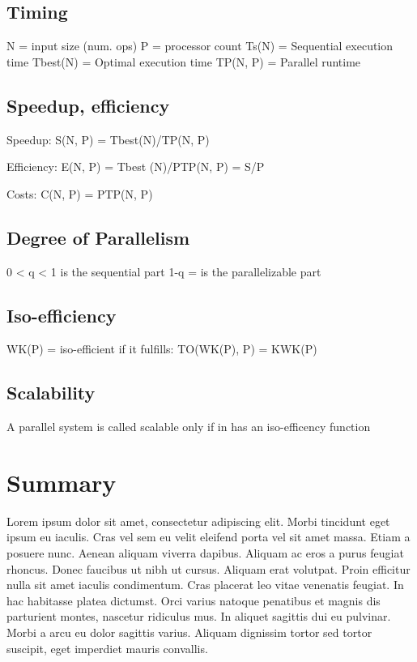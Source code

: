 \documentclass[openany]{book}
\begin{document}
\subsection{Timing}
	N = input size (num. ops)
	P = processor count
	Ts(N) = Sequential execution time
	Tbest(N) = Optimal execution time
	TP(N, P) = Parallel runtime

\subsection{Speedup, efficiency}
	Speedup: 
S(N, P) = Tbest(N)/TP(N, P)

	Efficiency: 
E(N, P) = Tbest (N)/PTP(N, P) = S/P

	Costs: 
C(N, P) = PTP(N, P)

\subsection{Degree of Parallelism}
	0 < q < 1 is the sequential part
	1-q = is the parallelizable part

\subsection{Iso-efficiency}
	WK(P) = iso-efficient if it fulfills:
	TO(WK(P), P) = KWK(P)~\cite[p.~350]{Lang17}

\subsection{Scalability}
	A parallel system is called scalable only if in has an iso-efficency function


\section{Summary}
Lorem ipsum dolor sit amet, consectetur adipiscing elit. Morbi tincidunt eget 
ipsum eu iaculis. Cras vel sem eu velit eleifend porta vel sit amet massa. Etiam 
a posuere nunc. Aenean aliquam viverra dapibus. Aliquam ac eros a purus feugiat 
rhoncus. Donec faucibus ut nibh ut cursus. Aliquam erat volutpat. Proin efficitur 
nulla sit amet iaculis condimentum. Cras placerat leo vitae venenatis feugiat. In 
hac habitasse platea dictumst. Orci varius natoque penatibus et magnis dis 
parturient montes, nascetur ridiculus mus. In aliquet sagittis dui eu pulvinar. 
Morbi a arcu eu dolor sagittis varius. Aliquam dignissim tortor sed tortor 
suscipit, eget imperdiet mauris convallis.
\end{document}
